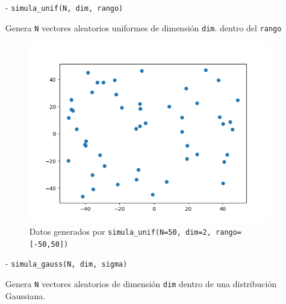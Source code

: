 \documentclass{article}
\begin{document}
    \begin{enumerate}
        \item[-]\texttt{simula\_unif(N, dim, rango)} \par 
        Genera \texttt{N} vectores aleatorios uniformes de dimensión \texttt{dim}.
        dentro del \texttt{rango}

        \begin{figure}[h]
            \centering
            \caption{Datos generados por \texttt{simula\_unif(N=50, dim=2, rango=[-50,50])}}
            \includegraphics[width=\textwidth]{uniform.png}
        \end{figure}
        \pagebreak
        \item[-]\texttt{simula\_gauss(N, dim, sigma)} \par
        Genera \texttt{N} vectores aleatorios  de dimensión \texttt{dim} dentro de una distribución Gaussiana.


\end{enumerate}
\end{document}
